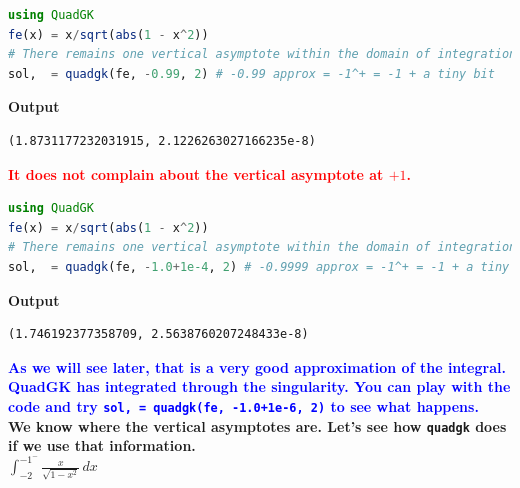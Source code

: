 \begin{lstlisting}[language=Julia,style=mystyle]
using QuadGK
fe(x) = x/sqrt(abs(1 - x^2))
# There remains one vertical asymptote within the domain of integration 
sol,  = quadgk(fe, -0.99, 2) # -0.99 approx = -1^+ = -1 + a tiny bit
\end{lstlisting}
\textbf{Output} 
\begin{verbatim}
(1.8731177232031915, 2.1226263027166235e-8)
\end{verbatim}
\textcolor{red}{\bf It does not complain about the vertical asymptote at $+1$.} \\
\begin{lstlisting}[language=Julia,style=mystyle]
using QuadGK
fe(x) = x/sqrt(abs(1 - x^2))
# There remains one vertical asymptote within the domain of integration 
sol,  = quadgk(fe, -1.0+1e-4, 2) # -0.9999 approx = -1^+ = -1 + a tiny bit
\end{lstlisting}
\textbf{Output} 
\begin{verbatim}
(1.746192377358709, 2.5638760207248433e-8)
\end{verbatim}
\textcolor{blue}{\bf As we will see later, that is a very good approximation of the integral. QuadGK has integrated through the singularity. You can play with the code and try \texttt{sol,  = quadgk(fe, -1.0+1e-6, 2)}  to see what happens.}\\


\textbf{We know where the vertical asymptotes are. Let's see how \texttt{quadgk} does if we use that information.}\\

$\int_{-2}^{-1^-} \frac{x}{\sqrt{1 - x^2}} \, dx$ \\

